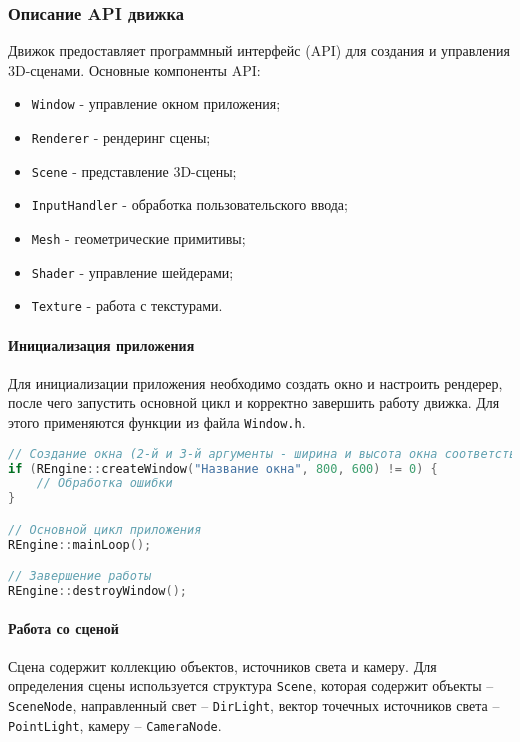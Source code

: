 \subsubsection{Описание API движка}

Движок предоставляет программный интерфейс (API) для создания и управления 3D-сценами. Основные компоненты API:

\begin{itemize}
    \item \texttt{Window} - управление окном приложения;
    \item \texttt{Renderer} - рендеринг сцены;
    \item \texttt{Scene} - представление 3D-сцены;
    \item \texttt{InputHandler} - обработка пользовательского ввода;
    \item \texttt{Mesh} - геометрические примитивы;
    \item \texttt{Shader} - управление шейдерами;
    \item \texttt{Texture} - работа с текстурами.
\end{itemize}

\paragraph{Инициализация приложения}

Для инициализации приложения необходимо создать окно и настроить рендерер, после чего запустить основной цикл и корректно завершить работу движка. Для этого применяются функции из файла \texttt{Window.h}.

\begin{lstlisting}[language=C++, caption=Пример инициализации приложения]
// Создание окна (2-й и 3-й аргументы - ширина и высота окна соответственно)
if (REngine::createWindow("Название окна", 800, 600) != 0) {
    // Обработка ошибки
}

// Основной цикл приложения
REngine::mainLoop();

// Завершение работы
REngine::destroyWindow();
\end{lstlisting}

\paragraph{Работа со сценой}

Сцена содержит коллекцию объектов, источников света и камеру. Для определения сцены используется структура \texttt{Scene}, которая содержит объекты -- \texttt{SceneNode}, направленный свет -- \texttt{DirLight}, вектор точечных источников света -- \texttt{PointLight}, камеру -- \texttt{CameraNode}.

